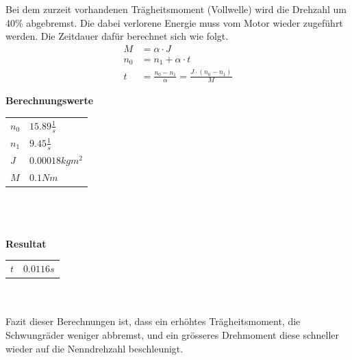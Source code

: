 Bei dem zurzeit vorhandenen Trägheitsmoment (Vollwelle) wird die Drehzahl um 40\% 
abgebremst. Die dabei verlorene Energie muss vom Motor wieder zugeführt werden. 
Die Zeitdauer dafür berechnet sich wie folgt.
\begin{align}
	M &= \alpha \cdot J \\
	n_0 &= n_1 + \alpha \cdot t \\
	t &= \frac{n_0 - n_1}{\alpha} = \frac{J \cdot \left(n_0 - n_1\right)}{M}
\end{align}

\textbf{Berechnungswerte}\\
\begin{tabular}{ll}
	\rule{0pt}{11pt} $n_0$ & $15.89 \frac{1}{s}$ \\
	\rule{0pt}{11pt} $n_1$ & $9.45 \frac{1}{s}$ \\
	\rule{0pt}{11pt} $J$ & $0.00018 kgm^2$ \\
	\rule{0pt}{11pt} $M$ & $0.1 Nm$ \\
\end{tabular}\\
\\
\\
\textbf{Resultat}\\
\begin{tabular}{ll}
	\rule{0pt}{11pt} $t$ & $0.0116 s$ \\
\end{tabular}\\
\\
Fazit dieser Berechnungen ist, dass ein erhöhtes Trägheitsmoment, die Schwungräder 
weniger abbremst, und ein grösseres Drehmoment diese schneller wieder auf die 
Nenndrehzahl beschleunigt. 
